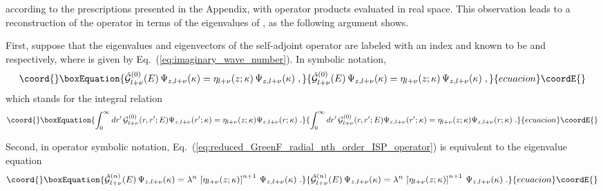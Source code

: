 \documentclass[a4paper,preprint,draft,showpacs,amsmath,amsfonts,amssymb,aps,prd]{revtex4}%
\begin{document}
according to the prescriptions presented in the Appendix,
with operator products evaluated in real space.
This observation leads to a reconstruction of the operator 
\coordHE{} in terms of the eigenvalues of
\coordHE{}, as the following argument shows.

First, suppose that the eigenvalues and eigenvectors
of the self-adjoint operator 
\coordHE{} are
labeled with an index \coordHE{} and
known to be \coordHE{} and
\coordHE{} respectively,
where \myHighlight{$\kappa$}\coordHE{} is given by Eq.~(\ref{eq:imaginary_wave_number}). 
In symbolic notation,
\begin{equation}\coord{}\boxEquation{
\hat{ {\mathcal G}}^{(0)}_{l+\nu} (E)
\,
\Psi_{z,l+\nu}(\kappa)
=
\eta_{l+\nu} (z;\kappa)
\,
\Psi_{z,l+\nu}(\kappa)
\;   ,
\label{eq:eigenvalue_problem_G_zero}
}{
\hat{ {\mathcal G}}^{(0)}_{l+\nu} (E)
\,
\Psi_{z,l+\nu}(\kappa)
=
\eta_{l+\nu} (z;\kappa)
\,
\Psi_{z,l+\nu}(\kappa)
\;   ,
}{ecuacion}\coordE{}\end{equation} 
which stands for the integral relation
\begin{equation}\coord{}\boxEquation{
\int_{0}^{\infty}
  d r'  
\,
{\mathcal G}^{(0)}_{l+\nu} (r,r';E)
\Psi_{z,l+\nu} (r';\kappa)
=
\eta_{l+\nu}(z;\kappa)
\Psi_{z,l+\nu} (r;\kappa)
\;  .
\label{eq:eigenvalue_problem_G_zero_integral}
}{
\int_{0}^{\infty}
  d r'  
\,
{\mathcal G}^{(0)}_{l+\nu} (r,r';E)
\Psi_{z,l+\nu} (r';\kappa)
=
\eta_{l+\nu}(z;\kappa)
\Psi_{z,l+\nu} (r;\kappa)
\;  .
}{ecuacion}\coordE{}\end{equation}

Second, in operator symbolic notation,
Eq.~(\ref{eq:reduced_GreenF_radial_nth_order_ISP_operator})
is equivalent to the eigenvalue equation
\begin{equation}\coord{}\boxEquation{
\hat{ {\mathcal G}}^{(n)}_{l+\nu} (E)
\,
\Psi_{z,l+\nu}(\kappa)
=
\lambda^{n}
\, 
\left[ 
\eta_{l+\nu} (z;\kappa)
\right]^{n+1}
\,
\Psi_{z,l+\nu}(\kappa)
\;   .
\label{eq:reduced_GreenF_radial_nth_order_ISP_eigenvalue_eq}
}{
\hat{ {\mathcal G}}^{(n)}_{l+\nu} (E)
\,
\Psi_{z,l+\nu}(\kappa)
=
\lambda^{n}
\, 
\left[ 
\eta_{l+\nu} (z;\kappa)
\right]^{n+1}
\,
\Psi_{z,l+\nu}(\kappa)
\;   .
}{ecuacion}\coordE{}\end{equation} 
\end{document}
